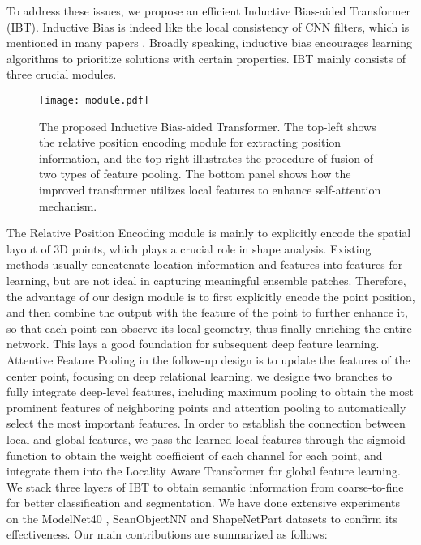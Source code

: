 \documentclass[conference]{IEEEtran}
\begin{document}
To address these issues, we propose an efficient Inductive Bias-aided Transformer (IBT). Inductive Bias is indeed like the local consistency of CNN filters, which is mentioned in many papers \cite{dosovitskiy2020image,battaglia2018relational,goyal2022inductive}. Broadly speaking, inductive bias encourages learning algorithms to prioritize solutions with certain properties. IBT mainly consists of three crucial modules.
\begin{figure*}[t]
    \centering
   \texttt{[image: module.pdf]}
   \caption{The proposed Inductive Bias-aided Transformer. The top-left shows the relative position encoding module for extracting position information, and the top-right illustrates the procedure of fusion of two types of feature pooling. The bottom panel shows how the improved transformer utilizes local features to enhance self-attention mechanism.}
\label{module}
\vspace{-4mm}
\end{figure*}

The Relative Position Encoding module is mainly to explicitly encode the spatial layout of 3D points, which plays a crucial role in shape analysis. Existing methods 
\cite{qi2017pointnet++,zhao2019pointweb,wang2019dynamic} usually concatenate location information and features into features for learning, but are not ideal in capturing meaningful ensemble patches. Therefore, the advantage of our design module is to first explicitly encode the point position, and then combine the output with the feature of the point to further enhance it, so that each point can observe its local geometry, thus finally enriching the entire network. This lays a good foundation for subsequent deep feature learning. Attentive Feature Pooling in the follow-up design is to update the features of the center point, focusing on deep relational learning. we designe two branches to fully integrate deep-level features, including maximum pooling to obtain the most prominent features of neighboring points and attention pooling to automatically select the most important features. In order to establish the connection between local and global features, we pass the learned local features through the sigmoid function to obtain the weight coefficient of each channel for each point, and integrate them into the Locality Aware Transformer for global feature learning.
We stack three layers of IBT to obtain semantic information from coarse-to-fine for better classification and segmentation. We have done extensive experiments on the ModelNet40 \cite{wu20153d}, ScanObjectNN \cite{uy2019revisiting} and ShapeNetPart \cite{yi2016scalable} datasets to confirm its effectiveness. Our main contributions are summarized as follows:
\end{document}
